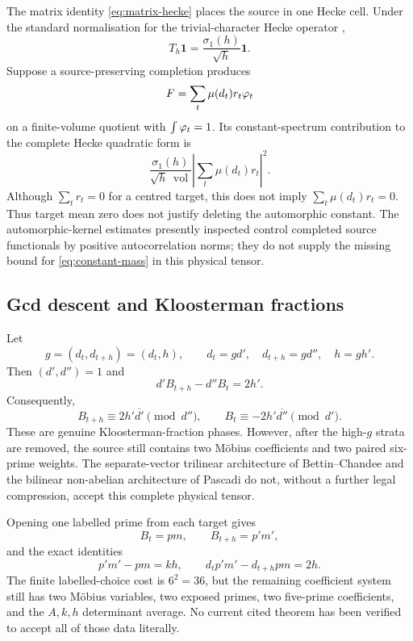 The matrix identity \cref{eq:matrix-hecke} places the source in one Hecke cell.
Under the standard normalisation for the trivial-character Hecke operator
\cite{Iwaniec2002},
\begin{equation}\label{eq:hecke-constant}
                    T_h\mathbf1=\frac{\sigma_1(h)}{\sqrt h}\mathbf1.
\end{equation}
Suppose a source-preserving completion produces
\[
             F=\sum_t\mu(d_t)r_t\varphi_t
\]
on a finite-volume quotient with $\int\varphi_t=1$.  Its constant-spectrum
contribution to the complete Hecke quadratic form is
\begin{equation}\label{eq:constant-mass}
 \boxed{
 \frac{\sigma_1(h)}{\sqrt h\,\operatorname{vol}}
      \left|\sum_t\mu(d_t)r_t\right|^2.
 }
\end{equation}
Although $\sum_tr_t=0$ for a centred target, this does not imply
$\sum_t\mu(d_t)r_t=0$.  Thus target mean zero does not justify deleting the
automorphic constant.  The automorphic-kernel estimates presently inspected
\cite{GrimmeltMerikoski2025} control completed source functionals by positive
autocorrelation norms; they do not supply the missing bound for
\cref{eq:constant-mass} in this physical tensor.

\subsection{Gcd descent and Kloosterman fractions}

Let
\[
 g=(d_t,d_{t+h})=(d_t,h),
 \qquad d_t=gd',\quad d_{t+h}=gd'',\quad h=gh'.
\]
Then $(d',d'')=1$ and
\begin{equation}\label{eq:gcd-desc-det}
                  d'B_{t+h}-d''B_t=2h'.
\end{equation}
Consequently,
\begin{equation}\label{eq:kloosterman-congruences}
 B_{t+h}\equiv2h'\overline{d'}\pmod{d''},
 \qquad
 B_t\equiv-2h'\overline{d''}\pmod{d'}.
\end{equation}
These are genuine Kloosterman-fraction phases.  However, after the high-$g$
strata are removed, the source still contains two M\"obius coefficients and
two paired six-prime weights.  The separate-vector trilinear architecture of
Bettin--Chandee \cite{BettinChandee2018} and the bilinear non-abelian
architecture of Pascadi \cite{Pascadi2025} do not, without a further legal
compression, accept this complete physical tensor.

Opening one labelled prime from each target gives
\begin{equation}\label{eq:prime-open}
 B_t=pm,\qquad B_{t+h}=p'm',
\end{equation}
and the exact identities
\begin{equation}\label{eq:prime-open-identities}
        p'm'-pm=kh,
 \qquad d_tp'm'-d_{t+h}pm=2h.
\end{equation}
The finite labelled-choice cost is $6^2=36$, but the remaining coefficient
system still has two M\"obius variables, two exposed primes, two five-prime
coefficients, and the $A,k,h$ determinant average.  No current cited theorem has
been verified to accept all of those data literally.

